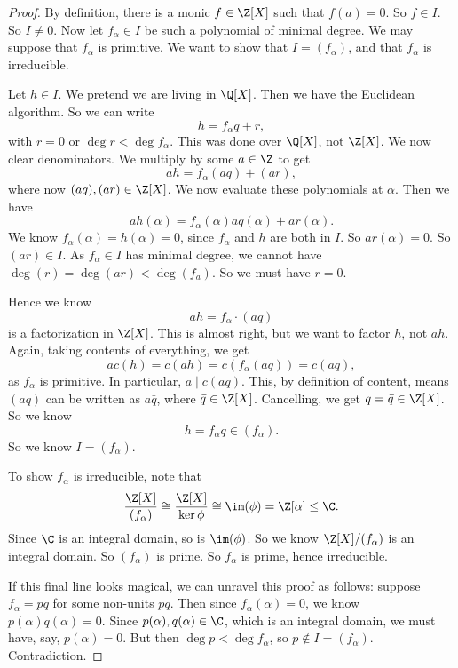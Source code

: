\documentclass[a4paper]{article}
\begin{document}
\begin{proof}
  By definition, there is a monic $f \in \Z[X]$ such that $f(a) = 0$. So $f \in I$. So $I \not= 0$. Now let $f_\alpha \in I$ be such a polynomial of minimal degree. We may suppose that $f_\alpha$ is primitive. We want to show that $I = (f_\alpha)$, and that $f_\alpha$ is irreducible.

  Let $h \in I$. We pretend we are living in $\Q[X]$. Then we have the Euclidean algorithm. So we can write
  \[
    h = f_\alpha q + r,
  \]
  with $r = 0$ or $\deg r < \deg f_\alpha$. This was done over $\Q[X]$, not $\Z[X]$. We now clear denominators. We multiply by some $a \in \Z$ to get
  \[
    ah = f_\alpha (aq) + (ar),
  \]
  where now $(aq), (ar) \in \Z[X]$. We now evaluate these polynomials at $\alpha$. Then we have
  \[
    a h(\alpha) = f_\alpha(\alpha) aq(\alpha) + ar(\alpha).
  \]
  We know $f_\alpha(\alpha) = h(\alpha) = 0$, since $f_\alpha$ and $h$ are both in $I$. So $ar(\alpha) = 0$. So $(ar) \in I$. As $f_\alpha \in I$ has minimal degree, we cannot have $\deg (r) = \deg(ar) < \deg(f_a)$. So we must have $r = 0$.

  Hence we know
  \[
    a h = f_\alpha \cdot(aq)
  \]
  is a factorization in $\Z[X]$. This is almost right, but we want to factor $h$, not $ah$. Again, taking contents of everything, we get
  \[
    a c(h) = c(ah) = c(f_\alpha (aq)) = c(aq),
  \]
  as $f_\alpha$ is primitive. In particular, $a \mid c(aq)$. This, by definition of content, means $(aq)$ can be written as $a \bar{q}$, where $\bar{q} \in \Z[X]$. Cancelling, we get $q = \bar{q} \in \Z[X]$. So we know
  \[
    h = f_\alpha q \in (f_\alpha).
  \]
  So we know $I = (f_\alpha)$.

  To show $f_\alpha$ is irreducible, note that
  \[
    \frac{\Z[X]}{(f_\alpha)} \cong \frac{\Z[X]}{\ker \phi} \cong \im (\phi) = \Z[\alpha] \leq \C.
  \]
  Since $\C$ is an integral domain, so is $\im(\phi)$. So we know $\Z[X]/(f_\alpha)$ is an integral domain. So $(f_\alpha)$ is prime. So $f_\alpha$ is prime, hence irreducible.

  If this final line looks magical, we can unravel this proof as follows: suppose $f_\alpha = pq$ for some non-units $pq$. Then since $f_\alpha(\alpha) = 0$, we know $p(\alpha) q(\alpha) = 0$. Since $p(\alpha), q(\alpha) \in \C$, which is an integral domain, we must have, say, $p(\alpha) = 0$. But then $\deg p < \deg f_\alpha$, so $p \not\in I = (f_\alpha)$. Contradiction.
\end{proof}
\end{document}
